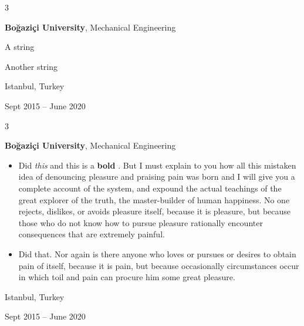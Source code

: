 \documentclass[10pt, letterpaper]{article}
\newenvironment{summary}{
    \begin{description}[
        topsep=0.10 cm,
        parsep=0.10 cm,
        partopsep=0pt,
        itemsep=0pt,
        leftmargin=0.4 cm + 10pt
    ]
}{
    \end{description}
} %
\newenvironment{highlights}{
    \begin{itemize}[
        topsep=0.10 cm,
        parsep=0.10 cm,
        partopsep=0pt,
        itemsep=0pt,
        leftmargin=0.4 cm + 10pt
    ]
}{
    \end{itemize}
} %
\newenvironment{threecolentry}[3][]{
    \onecolentry
    \def\thirdColumn{#3}
    \setcolumnwidth{1 cm, \fill, 4.5 cm}
    \begin{paracol}{3}
    {\raggedright #2} \switchcolumn
}{
    \switchcolumn \raggedleft \thirdColumn
    \end{paracol}
    \endonecolentry
} %
\let\hrefWithoutArrow\href
\renewcommand{\href}[2]{\hrefWithoutArrow{#1}{\ifthenelse{\equal{#2}{}}{ }{#2 }\raisebox{.15ex}{\footnotesize \faExternalLink*}}}
\begin{document}
        \vspace{0.2 cm}

        \begin{threecolentry}{\textbf{}}{
            Istanbul, Turkey

        Sept 2015 – June 2020
        }
            \textbf{Boğaziçi University}, Mechanical Engineering
            \begin{summary}
                \item A string
                \item Another string
            \end{summary}
        \end{threecolentry}

        \vspace{0.2 cm}

        \begin{threecolentry}{\textbf{}}{
            Istanbul, Turkey

        Sept 2015 – June 2020
        }
            \textbf{Boğaziçi University}, Mechanical Engineering
            \begin{highlights}
                \item Did \textit{this} and this is a \textbf{bold} \href{https://example.com}{link}. But I must explain to you how all this mistaken idea of denouncing pleasure and praising pain was born and I will give you a complete account of the system, and expound the actual teachings of the great explorer of the truth, the master-builder of human happiness. No one rejects, dislikes, or avoids pleasure itself, because it is pleasure, but because those who do not know how to pursue pleasure rationally encounter consequences that are extremely painful.
                \item Did that. Nor again is there anyone who loves or pursues or desires to obtain pain of itself, because it is pain, but because occasionally circumstances occur in which toil and pain can procure him some great pleasure.
            \end{highlights}
        \end{threecolentry}

        \vspace{0.2 cm}
\end{document}
